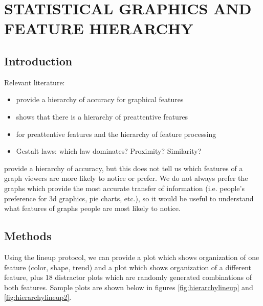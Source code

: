 \documentclass[11pt]{isuthesis}\usepackage[]{graphicx}\usepackage[]{color}
\begin{document}
\chapter{STATISTICAL GRAPHICS AND FEATURE HIERARCHY}\label{featurehierarchy}


\graphicspath{{Figure/FeatureHierarchy/}{Images/FeatureHierarchy/}}
\renewcommand{\floatpagefraction}{.99}



\section{Introduction}
Relevant literature:
\begin{itemize}
\item \citet{cleveland:1984,cleveland:1985} provide a hierarchy of accuracy for graphical features
\item \citet{healey1996high} shows that there is a hierarchy of preattentive features
\item \citet{treisman1985preattentive} for preattentive features and the hierarchy of feature processing
\item Gestalt laws: which law dominates? Proximity? Similarity?
\end{itemize}

\citet{cleveland:1985} provide a hierarchy of accuracy, but this does not tell us which features of a graph viewers are more likely to notice or prefer. We do not always prefer the graphs which provide the most accurate transfer of information (i.e. people's preference for 3d graphics, pie charts, etc.), so it would be useful to understand what features of graphs people are most likely to notice. 

\section{Methods}
Using the lineup protocol, we can provide a plot which shows organization of one feature (color, shape, trend) and a plot which shows organization of a different feature, plus 18 distractor plots which are randomly generated combinations of both features. Sample plots are shown below in figures \ref{fig:hierarchylineup} and \ref{fig:hierarchylineup2}.
\end{document}
